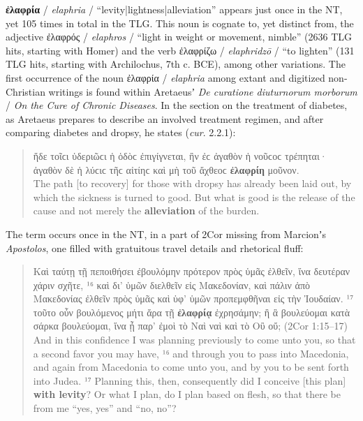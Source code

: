 \noindent{}\textbf{ἐλαφρία} / \textit{elaphria} / “levity|lightness|alleviation” appears just once in the NT, %
yet 105 times in total in the TLG. %
This noun is cognate to, yet distinct from, the adjective ἐλαφρός / \textit{elaphros} / %
“light in weight or movement, nimble” (2636 TLG hits, starting with Homer) %
and the verb ἐλαφρίζω / \textit{elaphridzō} / “to lighten” (131 TLG hits, starting with Archilochus, 7th c. BCE), %
among other variations. %
The first occurrence of the noun ἐλαφρία / \textit{elaphria} among extant and digitized non-Christian writings %
is found within Aretaeusʼ \textit{De curatione diuturnorum morborum} / %
\textit{On the Cure of Chronic Diseases}. %
In the section on the treatment of diabetes, %
as Aretaeus prepares to describe an involved treatment regimen, %
and after comparing diabetes and dropsy, %
he states (\textit{cur}. 2.2.1): %

\vspace*{2.5mm} 
 \begin{quote}ἥδε τοῖϲι ὑδεριῶϲι ἡ ὁδὸϲ ἐπιγίγνεται, %
 ἢν ἐϲ ἀγαθὸν ἡ νοῦϲοϲ τρέπηται· 
 ἀγαθὸν δὲ ἡ λύϲιϲ τῆϲ αἰτίηϲ καὶ μὴ τοῦ ἄχθεοϲ \textbf{ἐλαφρίη} μοῦνον. \\[1mm] %
 The path [to recovery] for those with dropsy has already been laid out, %
 by which the sickness is turned to good. %
 But what is good is the release of the cause and not merely the \textbf{alleviation} of the burden. %
 \end{quote} %
 \clearpage

\noindent{}The term occurs once in the NT, %
in a part of 2Cor missing from Marcionʼs \textit{Apostolos}, %
one filled with gratuitous travel details and rhetorical fluff: %

\vspace*{3mm} 
 \begin{quote}Καὶ ταύτῃ τῇ πεποιθήσει ἐβουλόμην πρότερον πρὸς ὑμᾶς ἐλθεῖν, %
 ἵνα δευτέραν χάριν σχῆτε, %
 ¹⁶ καὶ δι’ ὑμῶν διελθεῖν εἰς Μακεδονίαν, καὶ πάλιν ἀπὸ Μακεδονίας
 ἐλθεῖν πρὸς ὑμᾶς καὶ ὑφ’ ὑμῶν προπεμφθῆναι εἰς τὴν Ἰουδαίαν. %
 ¹⁷ τοῦτο οὖν βουλόμενος μήτι ἄρα τῇ \textbf{ἐλαφρίᾳ} ἐχρησάμην; %
 ἢ ἃ βουλεύομαι κατὰ σάρκα βουλεύομαι, %
 ἵνα ᾖ παρ’ ἐμοὶ τὸ Ναὶ ναὶ καὶ τὸ Οὒ οὔ; (2Cor 1:15--17)\\[1mm] %
 And in this confidence I was planning previously to come unto you, %
 so that a second favor you may have, %
 ¹⁶ and through you to pass into Macedonia, %
 and again from Macedonia to come unto you, %
 and by you to be sent forth into Judea. %
 ¹⁷ Planning this, then, consequently did I conceive [this plan] \textbf{with levity}? %
 Or what I plan, do I plan based on flesh, %
 so that there be from me “yes, yes” and “no, no”?\end{quote} %
 \vspace*{3mm}

